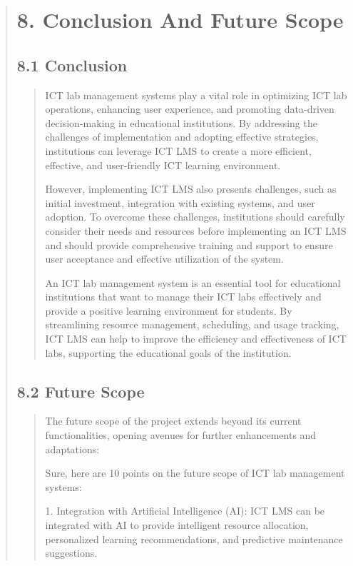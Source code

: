 \documentclass[12pt]{report}
\begin{document}
	
	\begin{quote}
		\section{8. Conclusion And Future Scope}
		\subsection{8.1 Conclusion}
		\begin{quote}
			ICT lab management systems play a vital role in optimizing ICT lab operations, enhancing user experience, and promoting data-driven decision-making in educational institutions. By addressing the challenges of implementation and adopting effective strategies, institutions can leverage ICT LMS to create a more efficient, effective, and user-friendly ICT learning environment.
			
			However, implementing ICT LMS also presents challenges, such as initial investment, integration with existing systems, and user adoption. To overcome these challenges, institutions should carefully consider their needs and resources before implementing an ICT LMS and should provide comprehensive training and support to ensure user acceptance and effective utilization of the system.
			
			An ICT lab management system is an essential tool for educational institutions that want to manage their ICT labs effectively and provide a positive learning environment for students. By streamlining resource management, scheduling, and usage tracking, ICT LMS can help to improve the efficiency and effectiveness of ICT labs, supporting the educational goals of the institution.
		\end{quote}
		
		\subsection{8.2 Future Scope}
		\begin{quote}
			The future scope of the project extends beyond its current functionalities, opening avenues for further enhancements and adaptations:
			
			Sure, here are 10 points on the future scope of ICT lab management systems:
			
			1. Integration with Artificial Intelligence (AI): ICT LMS can be integrated with AI to provide intelligent resource allocation, personalized learning recommendations, and predictive maintenance suggestions.
			

\end{quote}
\end{quote}
\end{document}

